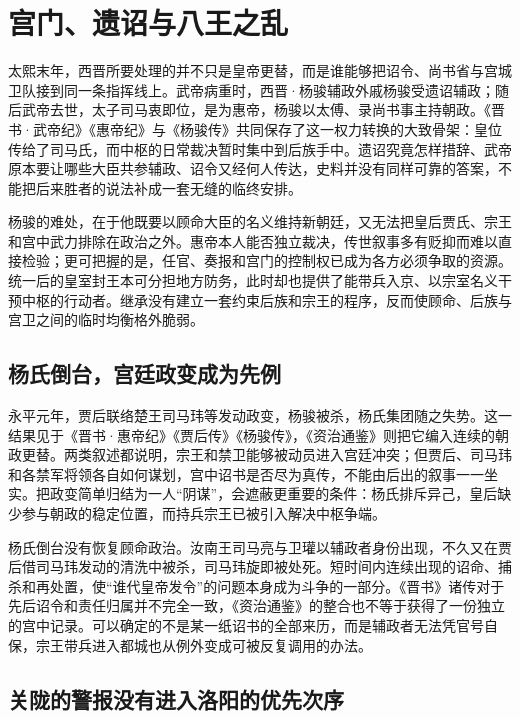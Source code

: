 \section{宫门、遗诏与八王之乱}
\label{sec:western-jin-court-politics-eight-princes}

太熙末年，西晋所要处理的并不只是皇帝更替，而是谁能够把诏令、尚书省与宫城卫队接到同一条指挥线上。武帝病重时，\hypertarget{evt:JH-0289-YANG-JUN-REGENT}{\textcolor{dynasty}{西晋·杨骏辅政}}外戚杨骏受遗诏辅政；随后武帝去世，太子司马衷即位，是为惠帝，杨骏以太傅、录尚书事主持朝政。《晋书·武帝纪》《惠帝纪》与《杨骏传》共同保存了这一权力转换的大致骨架：皇位传给了司马氏，而中枢的日常裁决暂时集中到后族手中。遗诏究竟怎样措辞、武帝原本要让哪些大臣共参辅政、诏令又经何人传达，史料并没有同样可靠的答案，不能把后来胜者的说法补成一套无缝的临终安排。

杨骏的难处，在于他既要以顾命大臣的名义维持新朝廷，又无法把皇后贾氏、宗王和宫中武力排除在政治之外。惠帝本人能否独立裁决，传世叙事多有贬抑而难以直接检验；更可把握的是，任官、奏报和宫门的控制权已成为各方必须争取的资源。统一后的皇室封王本可分担地方防务，此时却也提供了能带兵入京、以宗室名义干预中枢的行动者。继承没有建立一套约束后族和宗王的程序，反而使顾命、后族与宫卫之间的临时均衡格外脆弱。

\subsection{杨氏倒台，宫廷政变成为先例}

永平元年，贾后联络楚王司马玮等发动政变，杨骏被杀，杨氏集团随之失势。这一结果见于《晋书·惠帝纪》《贾后传》《杨骏传》，《资治通鉴》则把它编入连续的朝政更替。两类叙述都说明，宗王和禁卫能够被动员进入宫廷冲突；但贾后、司马玮和各禁军将领各自如何谋划，宫中诏书是否尽为真传，不能由后出的叙事一一坐实。把政变简单归结为一人“阴谋”，会遮蔽更重要的条件：杨氏排斥异己，皇后缺少参与朝政的稳定位置，而持兵宗王已被引入解决中枢争端。

杨氏倒台没有恢复顾命政治。汝南王司马亮与卫瓘以辅政者身份出现，不久又在贾后借司马玮发动的清洗中被杀，司马玮旋即被处死。短时间内连续出现的诏命、捕杀和再处置，使“谁代皇帝发令”的问题本身成为斗争的一部分。《晋书》诸传对于先后诏令和责任归属并不完全一致，《资治通鉴》的整合也不等于获得了一份独立的宫中记录。可以确定的不是某一纸诏书的全部来历，而是辅政者无法凭官号自保，宗王带兵进入都城也从例外变成可被反复调用的办法。

\subsection{关陇的警报没有进入洛阳的优先次序}

